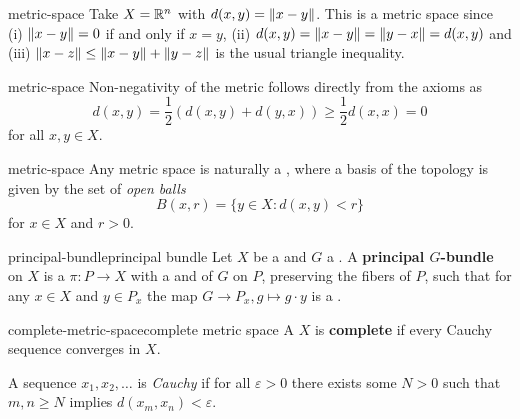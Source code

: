 \begin{example}{metric-space}
    Take $X = \mathbb{R}^n$ with $d(x, y) = \left\|x - y\right\|$. This is a metric space since (i) $\left\|x - y\right\| = 0$ if and only if $x = y$, (ii) $d(x, y) = \left\|x - y\right\| = \left\|y - x\right\| = d(x, y)$ and (iii) $\left\|x - z\right\| \le \left\|x - y\right\| + \left\|y - z\right\|$ is the usual triangle inequality.
\end{example}

\begin{example}{metric-space}
    Non-negativity of the metric follows directly from the axioms as
    \[ d(x, y) = \frac{1}{2} (d(x, y) + d(y, x)) \ge \frac{1}{2} d(x, x) = 0 \]
    for all $x, y \in X$.
\end{example}

\begin{example}{metric-space}
    Any metric space is naturally a , where a basis of the topology is given by the set of \textit{open balls}
    \[ B(x, r) = \{ y \in X : d(x, y) < r \} \]
    for $x \in X$ and $r > 0$.
\end{example}

\begin{topic}{principal-bundle}{principal bundle}
    Let $X$ be a  and $G$ a . A \textbf{principal $G$-bundle} on $X$ is a  $\pi : P \to X$ with a  and   of $G$ on $P$, preserving the fibers of $P$, such that for any $x \in X$ and $y \in P_x$ the map $G \to P_x, g \mapsto g \cdot y$ is a .
\end{topic}


\begin{topic}{complete-metric-space}{complete metric space}
    A  $X$ is \textbf{complete} if every Cauchy sequence converges in $X$.
    
    A sequence $x_1, x_2, \ldots$ is \textit{Cauchy} if for all $\varepsilon > 0$ there exists some $N > 0$ such that $m, n \ge N$ implies $d(x_m, x_n) < \varepsilon$.
\end{topic}

